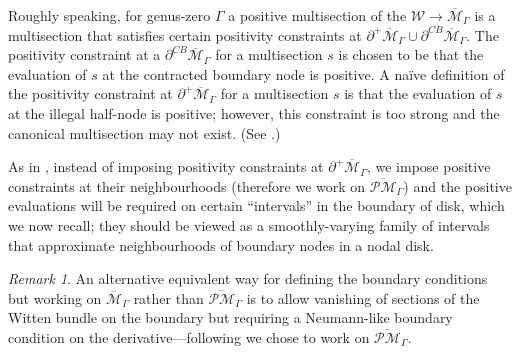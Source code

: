\documentclass[11pt]{amsart}
\theoremstyle{definition}
\theoremstyle{remark}
\newtheorem{rmk}[dummy]{Remark}
\newcommand{\oPMb}{{\overline{\mathcal{PM}}}}
\newcommand{\<}{\left<}
\renewcommand{\>}{\right>}
\numberwithin{equation}{section}
\def\Mbar{{\overline{\mathcal M}}}
\begin{document}
Roughly speaking, for genus-zero $\Gamma$ a positive multisection of the  $\mathcal W\to \Mbar_\Gamma$ is a multisection that satisfies certain positivity constraints at $\partial^+\Mbar_\Gamma\cup \partial^{CB}\Mbar_\Gamma$.  The positivity constraint at a $\partial^{CB}\Mbar_\Gamma$ for a multisection $s$ is chosen to be that the evaluation of $s$ at the contracted boundary node is positive. A na\"ive definition of the positivity constraint at $\partial^+\Mbar_\Gamma$ for a multisection $s$ is that the evaluation of $s$ at the illegal half-node is positive; however, this constraint is too strong and the canonical multisection may %
not exist. (See \cite[Example 3.23]{BCT2}.)

As %
in \cite{BCT2}, instead of imposing 
positivity constraints at $\partial^+\Mbar_\Gamma$, we impose positive constraints at their neighbourhoods (therefore we work on $\oPMb_\Gamma$) and the positive evaluations will be required on certain ``intervals'' in the boundary of disk, which we now recall; they should be viewed as a smoothly-varying family of intervals that approximate  neighbourhoods of boundary nodes in a nodal disk. 

\begin{rmk}
An alternative equivalent way %
for defining the boundary conditions but working on $\Mbar_{\Gamma}$ rather than $\oPMb_{\Gamma}$ is to allow vanishing of sections of the Witten bundle on %
the boundary but %
requiring a Neumann-like boundary condition on %
the derivative---following \cite{BCT2}
 we %
chose to work on $\oPMb_{\Gamma}.$\end{rmk}
\end{document}
